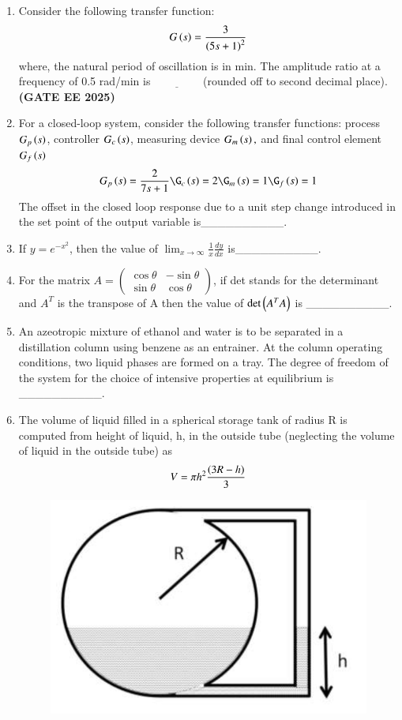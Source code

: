 \documentclass[journal,12pt,onecolumn]{IEEEtran}
\theoremstyle{remark}
\begin{document}
\begin{enumerate}
\item Consider the following transfer function:
	\begin{align} G\brak{s}=\frac{3}{\brak{5s+1}^{2}} \end{align}
where, the natural period of oscillation is in min. The amplitude ratio at a frequency of 0.5 rad/min is$\underline{\hspace{2cm}}$(rounded off to second decimal place). \hfill \textbf{(GATE EE 2025)} 


\item For a closed-loop system, consider the following transfer functions:
process $G_{p}\brak{s}$, controller $G_{c}\brak{s}$, measuring device $G_{m}\brak{s},$ and final control element $G_{f}\brak{s}$
\begin{align} G_{p}\brak{s} = \frac{2}{7s+1}
\G_{c}\brak{s}=2 
\G_{m}\brak{s}=1 
\G_{f}\brak{s}=1 \end{align}
The offset in the closed loop response due to a unit step change introduced in the set point of the output variable is\_\_\_\_\_\_\_\_\_\_.




\item If $y=e^{-x^{2}}$, then the value of $\lim_{x\rightarrow\infty}\frac{1}{x}\frac{dy}{dx}$ is\_\_\_\_\_\_\_\_\_\_.



\item For the matrix $A = \begin{pmatrix} \cos\theta & -\sin\theta \\ \sin\theta & \cos\theta \end{pmatrix}$, if det stands for the determinant and $A^{T}$ is the transpose of A then the value of $\det\brak{A^{T}A}$ is \_\_\_\_\_\_\_\_\_\_.



\item An azeotropic mixture of ethanol and water is to be separated in a distillation column using benzene as an entrainer. At the column operating conditions, two liquid phases are formed on a tray. The degree of freedom of the system for the choice of intensive properties at equilibrium is \_\_\_\_\_\_\_\_\_\_.




\item The volume of liquid filled in a spherical storage tank of radius R is computed from height of liquid, h, in the outside tube (neglecting the volume of liquid in the outside tube) as
\[ V=\pi h^{2}\frac{\brak{3R-h}}{3} \]
\begin{figure}
\begin{center}
\includegraphics[width=0.3\columnwidth]{figs/49.png}
     \caption{}
     \label{fig49}


\end{center}
\end{figure}
\end{enumerate}
\end{document}
